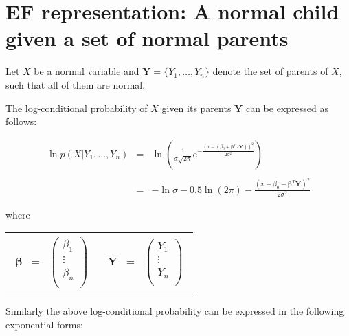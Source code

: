 \documentclass[11pt, oneside]{article}   	%
\newcommand{\bm}{\mathbf}
\newcommand{\bs}{\boldsymbol}
\newcommand{\me}{\mathrm{e}}
\numberwithin{figure}{section}
\numberwithin{equation}{section}
\numberwithin{table}{section}
\theoremstyle{definition}
\begin{document}
\begin{appendices}
\begin{itemize}
\end{itemize}


\newpage
\section{EF representation: A normal child given a set of normal parents}

Let $X$ be a normal variable and $ \mathbf{Y} = \{Y_1,\ldots,Y_n\}$ denote the set of parents of $X$, such that all of them are normal. 

The log-conditional probability of $X$ given its parents $\mathbf{Y}$ can be expressed as follows:

\begin{eqnarray*}
\ln p(X|Y_1,\ldots,Y_n) &=& \ln \left(\frac{1}{\sigma \sqrt{2\pi}} \me^{-\frac{(x-(\beta_0+ \bs \beta^T \cdot \bm Y))^2}{2\sigma^2}} \right)\\\\
&=&
- \ln{\sigma} - 0.5\ln{(2\pi)} - \frac{(x-\beta_0 - \bs \beta^T \mathbf{Y})^2}{2\sigma^2}
\end{eqnarray*}

where

\begin{tabular}{p{5.5cm}p{5.5cm}}
\begin{eqnarray*}
\bs \beta &=& 
\begin{pmatrix}
\beta_1\\
\vdots\\
\beta_n\\
\end{pmatrix}
\end{eqnarray*}
&
\begin{eqnarray*}
\bm Y &=& 
\begin{pmatrix}
Y_1\\
\vdots\\
Y_n\\
\end{pmatrix}
\end{eqnarray*}
\\
\end{tabular}

Similarly the above log-conditional probability can be expressed in the following exponential forms:



\end{appendices}
\end{document}
